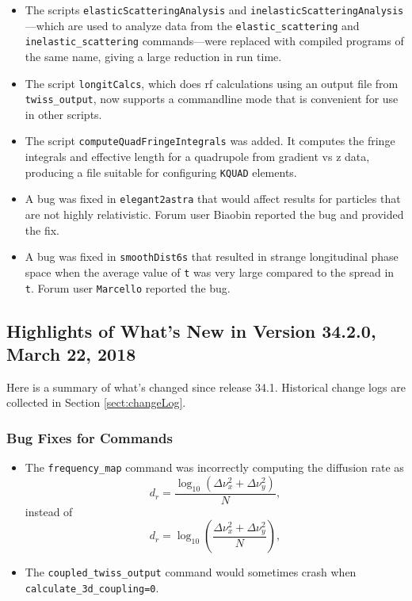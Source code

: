 \documentclass[11pt]{article}
\begin{document}
\begin{itemize}
\item The scripts \verb|elasticScatteringAnalysis| and \verb|inelasticScatteringAnalysis|---which are used to
  analyze data from the \verb|elastic_scattering| and \verb|inelastic_scattering| commands---were replaced with
  compiled programs of the same name, giving a large reduction in run time.
\item The script \verb|longitCalcs|, which does rf calculations using an output file from \verb|twiss_output|, 
  now supports a commandline mode that is convenient for use in other scripts.
\item The script \verb|computeQuadFringeIntegrals| was added. It computes the fringe integrals and effective
  length for a quadrupole from gradient vs z data, producing a file suitable for configuring \verb|KQUAD| elements.
\item A bug was fixed in \verb|elegant2astra| that would affect results for particles that are not
   highly relativistic. Forum user Biaobin reported the bug and provided the fix.
\item A bug was fixed in \verb|smoothDist6s| that resulted in strange longitudinal phase space when the 
  average value of \verb|t| was very large compared to the spread in \verb|t|. Forum user \verb|Marcello| reported
  the bug.
\end{itemize}

\subsection{Highlights of What's New in Version 34.2.0, March 22, 2018}

Here is a summary of what's changed since release 34.1.
Historical change logs are collected in Section \ref{sect:changeLog}.

\subsubsection{Bug Fixes for Commands}
\begin{itemize}
\item The \verb|frequency_map| command was incorrectly computing the diffusion rate as 
\begin{equation}
  d_r = \frac{\log_{10} \left(\Delta\nu_x^2 + \Delta\nu_y^2\right)}{N},
\end{equation}
instead of
\begin{equation}
  d_r = \log_{10} \left(\frac{\Delta\nu_x^2 + \Delta\nu_y^2}{N}\right),
\end{equation}
\item The \verb|coupled_twiss_output| command would sometimes crash when \verb|calculate_3d_coupling=0|. 
\end{itemize}
\end{document}
